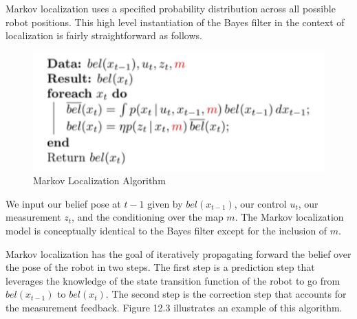 \documentclass[twoside]{article}
\begin{document}
Markov localization uses a specified probability distribution across all possible robot positions. This high level instantiation of the Bayes filter in the context of localization is fairly straightforward as follows.

\begin{figure}[H]
\centering
\includegraphics[width=.5\linewidth]{MarkovLocalizationAlgo.png}
\caption{Markov Localization Algorithm}
\label{fig:MarkovLocalizationAlgo}
\end{figure}

We input our belief pose at $t - 1$ given by $bel(x_{t-1})$, our control $u_t$, our measurement $z_t$, and the conditioning over the map $m$. The Markov localization model is conceptually identical to the Bayes filter except for the inclusion of $m$. 

Markov localization has the goal of iteratively propagating forward the belief over the pose of the robot in two steps. The first step is a prediction step that leverages the knowledge of the state transition function of the robot to go from $bel(x_{t-1})$ to $bel(x_t)$. The second step is the correction step that accounts for the measurement feedback. Figure 12.3 illustrates an example of this algorithm.
\end{document}
